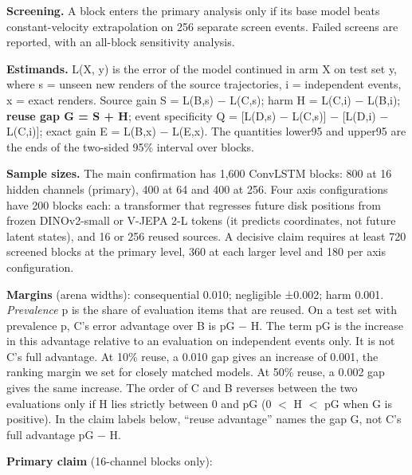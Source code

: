 \documentclass[10pt,letterpaper]{article}
\begin{document}
\textbf{Screening.} A block enters the primary analysis only
if its base model beats constant-velocity extrapolation on
256 separate screen events. Failed screens are reported,
with an all-block sensitivity analysis.

\textbf{Estimands.} L(X, y) is the error of the model
continued in arm X on test set y, where s = unseen new
renders of the source trajectories, i = independent events,
x = exact renders. Source gain S = L(B,s) − L(C,s); harm H =
L(C,i) − L(B,i); \textbf{reuse gap G = S + H}; event
specificity Q = {[}L(D,s) − L(C,s){]} − {[}L(D,i) −
L(C,i){]}; exact gain E = L(B,x) − L(E,x). The quantities
lower95 and upper95 are the ends of the two-sided 95\%
interval over blocks.

\textbf{Sample sizes.} The main confirmation has 1,600
ConvLSTM blocks: 800 at 16 hidden channels (primary), 400 at
64 and 400 at 256. Four axis configurations have 200 blocks
each: a transformer that regresses future disk positions
from frozen DINOv2-small or V-JEPA 2-L tokens (it predicts
coordinates, not future latent states), and 16 or 256 reused
sources. A decisive claim requires at least 720 screened
blocks at the primary level, 360 at each larger level and
180 per axis configuration.

\textbf{Margins} (arena widths): consequential 0.010;
negligible ±0.002; harm 0.001. \emph{Prevalence} p is the
share of evaluation items that are reused. On a test set
with prevalence p, C's error advantage over B is pG − H. The
term pG is the increase in this advantage relative to an
evaluation on independent events only. It is not C's full
advantage. At 10\% reuse, a 0.010 gap gives an increase of
0.001, the ranking margin we set for closely matched models.
At 50\% reuse, a 0.002 gap gives the same increase. The
order of C and B reverses between the two evaluations only
if H lies strictly between 0 and pG (0 \ensuremath{<} H
\ensuremath{<} pG when G is positive). In the claim labels
below, ``reuse advantage'' names the gap G, not C's full
advantage pG − H.

\textbf{Primary claim} (16-channel blocks only):
\end{document}
